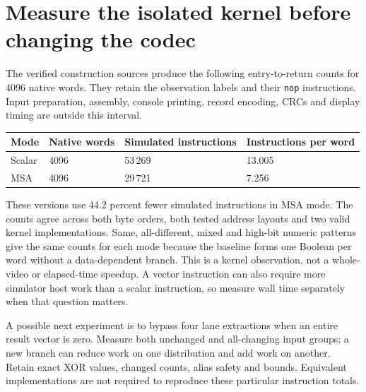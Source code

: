 \section{Measure the isolated kernel before changing the codec}
The verified construction sources produce the following entry-to-return counts for
4096 native words. They retain the observation labels and their \texttt{nop}
instructions. Input preparation, assembly, console printing, record encoding, CRCs
and display timing are outside this interval.
\begin{longtable}{p{30mm}p{30mm}p{38mm}p{43mm}}
\toprule Mode & Native words & Simulated instructions & Instructions per word \\\midrule
Scalar & 4096 & 53\,269 & 13.005 \\
MSA & 4096 & 29\,721 & 7.256 \\\bottomrule
\end{longtable}
These versions use 44.2 percent fewer simulated instructions in MSA mode. The counts
agree across both byte orders, both tested address layouts and two valid kernel
implementations. Same, all-different, mixed and high-bit numeric patterns give the
same counts for each mode because the baseline forms one Boolean per word without
a data-dependent branch. This is a kernel observation, not a whole-video or elapsed-time
speedup. A vector instruction can also require more simulator host work than a scalar
instruction, so measure wall time separately when that question matters.

A possible next experiment is to bypass four lane extractions when an entire result
vector is zero. Measure both unchanged and all-changing input groups; a new branch
can reduce work on one distribution and add work on another. Retain exact XOR values,
changed counts, alias safety and bounds. Equivalent implementations are not required
to reproduce these particular instruction totals.
